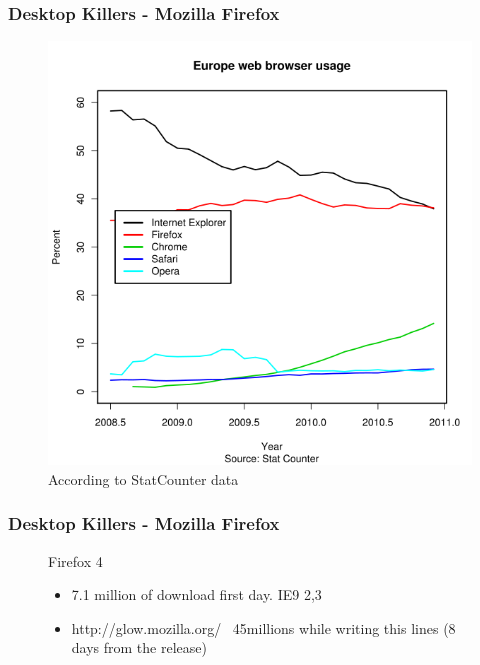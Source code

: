 \documentclass{beamer}
\begin{document}
\begin{frame}
\frametitle{Desktop Killers - Mozilla Firefox}
\begin{figure}
 \includegraphics[scale=0.30]{figs/stats2}
 \caption {According to StatCounter data }
\end{figure}
\end{frame}


\begin{frame}
\frametitle{Desktop Killers - Mozilla Firefox}
\begin{figure}
\item Firefox 4
	\begin{itemize}
	\item 7.1 million of download first day. IE9 2,3
	\item http://glow.mozilla.org/  ~45millions while writing this lines (8 days from the release)
	\end{itemize} 
\end{figure}
\end{frame}
\end{document}
